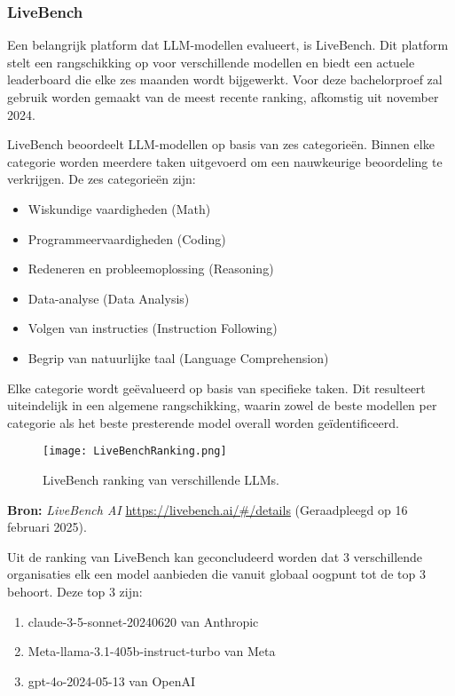         \subsubsection{LiveBench} 
        Een belangrijk platform dat LLM-modellen evalueert, is LiveBench. Dit platform stelt een rangschikking op voor verschillende modellen en biedt een actuele leaderboard die elke zes maanden wordt bijgewerkt. Voor deze bachelorproef zal gebruik worden gemaakt van de meest recente ranking, afkomstig uit november 2024.
        
        LiveBench beoordeelt LLM-modellen op basis van zes categorieën. Binnen elke categorie worden meerdere taken uitgevoerd om een nauwkeurige beoordeling te verkrijgen. De zes categorieën zijn:
        \begin{itemize}
            \item Wiskundige vaardigheden (Math)
            \item Programmeervaardigheden (Coding)
            \item Redeneren en probleemoplossing (Reasoning)
            \item Data-analyse (Data Analysis)
            \item Volgen van instructies (Instruction Following)
            \item Begrip van natuurlijke taal (Language Comprehension)
        \end{itemize}
        
        Elke categorie wordt geëvalueerd op basis van specifieke taken. Dit resulteert uiteindelijk in een algemene rangschikking, waarin zowel de beste modellen per categorie als het beste presterende model overall worden geïdentificeerd.
        
        \begin{figure}[h]
            \centering
            \texttt{[image: LiveBenchRanking.png]}
            \caption{LiveBench ranking van verschillende LLMs.}
            \label{fig:livebench}
        \end{figure}
        
        \noindent\textbf{Bron:} \textit{LiveBench AI} \url{https://livebench.ai/#/details} (Geraadpleegd op 16 februari 2025).
        
        Uit de ranking van LiveBench kan geconcludeerd worden dat 3 verschillende organisaties elk een model aanbieden die vanuit globaal oogpunt tot de top 3 behoort. Deze top 3 zijn: 
        \begin{enumerate}
           \item claude-3-5-sonnet-20240620 van Anthropic
           \item Meta-llama-3.1-405b-instruct-turbo van Meta
           \item gpt-4o-2024-05-13 van OpenAI
        \end{enumerate}
    
